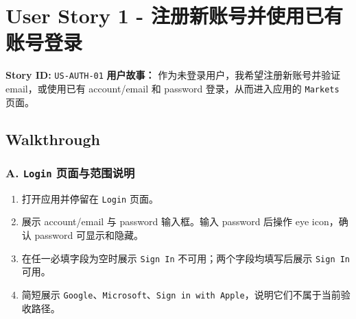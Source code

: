 \section{User Story 1 - 注册新账号并使用已有账号登录}
\textbf{Story ID:} \texttt{US-AUTH-01}
\textbf{用户故事：} 作为未登录用户，我希望注册新账号并验证 email，或使用已有 account/\allowbreak{}email 和 password 登录，从而进入应用的 \texttt{Markets} 页面。
\subsection{Walkthrough}
\subsubsection{A. \texttt{Login} 页面与范围说明}
\begin{enumerate}
\item 打开应用并停留在 \texttt{Login} 页面。
\item 展示 account/\allowbreak{}email 与 password 输入框。输入 password 后操作 eye icon，确认 password 可显示和隐藏。
\item 在任一必填字段为空时展示 \texttt{Sign In} 不可用；两个字段均填写后展示 \texttt{Sign In} 可用。
\item 简短展示 \texttt{Google}、\texttt{Microsoft}、\texttt{Sign in with Apple}，说明它们不属于当前验收路径。
\end{enumerate}
